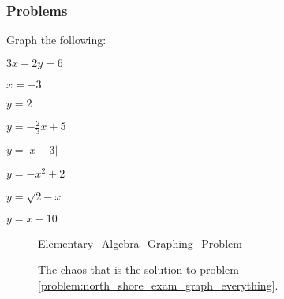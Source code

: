 \documentclass[crop=false,class=article,oneside]{standalone}
\begin{document}
        \subsubsection{Problems}
        \begin{problem}
        \label{problem:north_shore_exam_graph_everything}Graph the following:
        \begin{enumerate}
        \begin{multicols}{4}
            \item $3x-2y=6$
            \item $x=-3$
            \item $y=2$
            \item $y=-\frac{2}{3}x+5$
            \item $y=|x-3|$
            \item $y=-x^2+2$
            \item $y=\sqrt{2-x}$
            \item $y=x-10$
        \end{multicols}
        \end{enumerate}
        \end{problem}
        \begin{figure}[H]
            \centering
            \captionsetup{type=figure}
            {Elementary_Algebra_Graphing_Problem}
            \caption{The chaos that is the solution to problem
                     \ref{problem:north_shore_exam_graph_everything}.}
            \label{fig:north_shore_graphing_problem}
        \end{figure}
\end{document}
